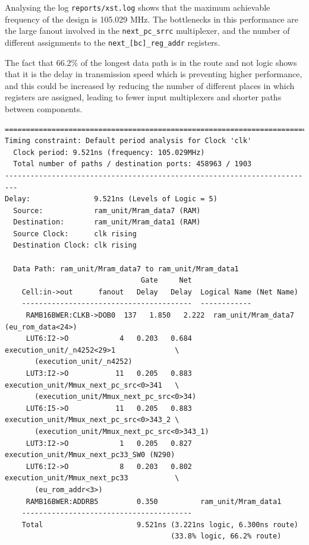 \documentclass[12pt,a4paper]{article}
\begin{document}
Analysing the log \texttt{reports/xst.log} shows that the maximum
achievable frequency of the design is 105.029 MHz. The bottlenecks in
this performance are the large fanout involved in the
\texttt{next\_pc\_srrc} multiplexer, and the number of different
assignments to the \texttt{next\_[bc]\_reg\_addr} registers.

The fact that 66.2\% of the longest data path is in the route and not
logic shows that it is the delay in transmission speed which is
preventing higher performance, and this could be increased by reducing
the number of different places in which registers are assigned,
leading to fewer input multiplexers and shorter paths between
components.

\newpage
\begin{verbatim}
=========================================================================
Timing constraint: Default period analysis for Clock 'clk'
  Clock period: 9.521ns (frequency: 105.029MHz)
  Total number of paths / destination ports: 458963 / 1903
-------------------------------------------------------------------------
Delay:               9.521ns (Levels of Logic = 5)
  Source:            ram_unit/Mram_data7 (RAM)
  Destination:       ram_unit/Mram_data1 (RAM)
  Source Clock:      clk rising
  Destination Clock: clk rising

  Data Path: ram_unit/Mram_data7 to ram_unit/Mram_data1
                                Gate     Net
    Cell:in->out      fanout   Delay   Delay  Logical Name (Net Name)
    ----------------------------------------  ------------
     RAMB16BWER:CLKB->DOB0  137   1.850   2.222  ram_unit/Mram_data7 (eu_rom_data<24>)
     LUT6:I2->O            4   0.203   0.684  execution_unit/_n4252<29>1              \
       (execution_unit/_n4252)
     LUT3:I2->O           11   0.205   0.883  execution_unit/Mmux_next_pc_src<0>341   \
       (execution_unit/Mmux_next_pc_src<0>34)
     LUT6:I5->O           11   0.205   0.883  execution_unit/Mmux_next_pc_src<0>343_2 \
       (execution_unit/Mmux_next_pc_src<0>343_1)
     LUT3:I2->O            1   0.205   0.827  execution_unit/Mmux_next_pc33_SW0 (N290)
     LUT6:I2->O            8   0.203   0.802  execution_unit/Mmux_next_pc33           \
       (eu_rom_addr<3>)
     RAMB16BWER:ADDRB5         0.350          ram_unit/Mram_data1
    ----------------------------------------
    Total                      9.521ns (3.221ns logic, 6.300ns route)
                                       (33.8% logic, 66.2% route)
\end{verbatim}
\end{document}
